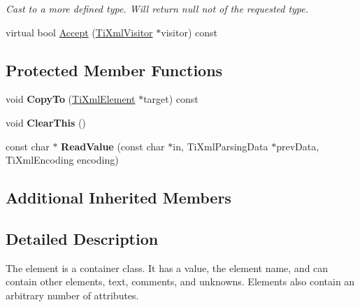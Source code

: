 \begin{DoxyCompactItemize}
\begin{DoxyCompactList}\small\item\em Cast to a more defined type. Will return null not of the requested type. \end{DoxyCompactList}\item 
virtual bool \hyperlink{class_ti_xml_element_a71a81b2afb0d42be1543d1c404dee6f5}{Accept} (\hyperlink{class_ti_xml_visitor}{Ti\-Xml\-Visitor} $\ast$visitor) const 
\end{DoxyCompactItemize}
\subsection*{Protected Member Functions}
\begin{DoxyCompactItemize}
\item 
\hypertarget{class_ti_xml_element_a9e0c1983b840de4134f1f6bf7af00b0f}{void {\bfseries Copy\-To} (\hyperlink{class_ti_xml_element}{Ti\-Xml\-Element} $\ast$target) const }\label{class_ti_xml_element_a9e0c1983b840de4134f1f6bf7af00b0f}

\item 
\hypertarget{class_ti_xml_element_a5670933ec2d7d9763b9891acc05d7f7d}{void {\bfseries Clear\-This} ()}\label{class_ti_xml_element_a5670933ec2d7d9763b9891acc05d7f7d}

\item 
\hypertarget{class_ti_xml_element_ad072ea0e78226a52f0a3872fa03bc29c}{const char $\ast$ {\bfseries Read\-Value} (const char $\ast$in, Ti\-Xml\-Parsing\-Data $\ast$prev\-Data, Ti\-Xml\-Encoding encoding)}\label{class_ti_xml_element_ad072ea0e78226a52f0a3872fa03bc29c}

\end{DoxyCompactItemize}
\subsection*{Additional Inherited Members}


\subsection{Detailed Description}
The element is a container class. It has a value, the element name, and can contain other elements, text, comments, and unknowns. Elements also contain an arbitrary number of attributes. 

